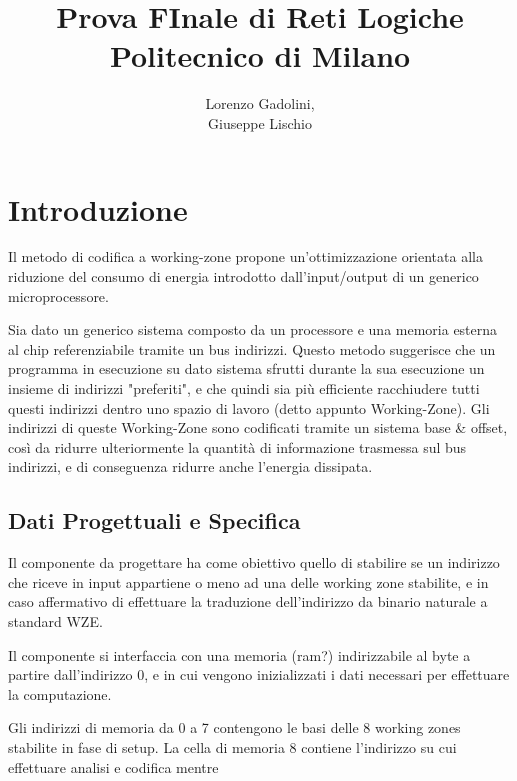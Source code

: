 \documentclass{article}
\title{Prova FInale di Reti Logiche\\ \large Politecnico di Milano}
\author{Lorenzo Gadolini, \\ Giuseppe Lischio}
\begin{document}
\maketitle


\tableofcontents


\newpage
{}




\setcounter{page}{1}


\section{Introduzione}

Il metodo di codifica a working-zone propone un'ottimizzazione orientata alla riduzione del consumo di energia introdotto dall'input/output di un generico microprocessore.

Sia dato un generico sistema composto da un processore e una memoria esterna al chip referenziabile tramite un bus indirizzi. Questo metodo suggerisce che un programma in esecuzione su dato sistema sfrutti durante la sua esecuzione un insieme di indirizzi "preferiti", e che quindi sia più efficiente racchiudere tutti questi indirizzi dentro uno spazio di lavoro (detto appunto Working-Zone). Gli indirizzi di queste Working-Zone sono codificati tramite un sistema base \& offset, così da ridurre ulteriormente la quantità di informazione trasmessa sul bus indirizzi, e di conseguenza ridurre anche l'energia dissipata.



\subsection{Dati Progettuali e Specifica}


Il componente da progettare ha come obiettivo quello di stabilire se un indirizzo che riceve in input appartiene o meno ad una delle working zone stabilite, e in caso affermativo di effettuare la traduzione dell'indirizzo da binario naturale a standard WZE.

Il componente si interfaccia con una memoria (ram?) indirizzabile al byte a partire dall'indirizzo 0, e in cui vengono inizializzati i dati necessari per effettuare la computazione.

Gli indirizzi di memoria da 0 a 7 contengono le basi delle 8 working zones stabilite in fase di setup. La cella di memoria 8 contiene l'indirizzo su cui effettuare analisi e codifica mentre
\end{document}
